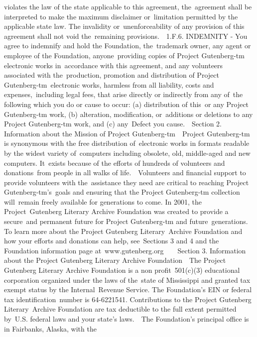 {violates the law of the state applicable to this agreement, the\
agreement shall be interpreted to make the maximum disclaimer or\
limitation permitted by the applicable state law. The invalidity or\
unenforceability of any provision of this agreement shall not void the\
remaining provisions.\
\
1.F.6. INDEMNITY - You agree to indemnify and hold the Foundation, the\
trademark owner, any agent or employee of the Foundation, anyone\
providing copies of Project Gutenberg-tm electronic works in\
accordance with this agreement, and any volunteers associated with the\
production, promotion and distribution of Project Gutenberg-tm\
electronic works, harmless from all liability, costs and expenses,\
including legal fees, that arise directly or indirectly from any of\
the following which you do or cause to occur: (a) distribution of this\
or any Project Gutenberg-tm work, (b) alteration, modification, or\
additions or deletions to any Project Gutenberg-tm work, and (c) any\
Defect you cause.\
\
Section 2. Information about the Mission of Project Gutenberg-tm\
\
Project Gutenberg-tm is synonymous with the free distribution of\
electronic works in formats readable by the widest variety of\
computers including obsolete, old, middle-aged and new computers. It\
exists because of the efforts of hundreds of volunteers and donations\
from people in all walks of life.\
\
Volunteers and financial support to provide volunteers with the\
assistance they need are critical to reaching Project Gutenberg-tm's\
goals and ensuring that the Project Gutenberg-tm collection will\
remain freely available for generations to come. In 2001, the Project\
Gutenberg Literary Archive Foundation was created to provide a secure\
and permanent future for Project Gutenberg-tm and future\
generations. To learn more about the Project Gutenberg Literary\
Archive Foundation and how your efforts and donations can help, see\
Sections 3 and 4 and the Foundation information page at\
www.gutenberg.org\
\
\
\
Section 3. Information about the Project Gutenberg Literary Archive Foundation\
\
The Project Gutenberg Literary Archive Foundation is a non profit\
501(c)(3) educational corporation organized under the laws of the\
state of Mississippi and granted tax exempt status by the Internal\
Revenue Service. The Foundation's EIN or federal tax identification\
number is 64-6221541. Contributions to the Project Gutenberg Literary\
Archive Foundation are tax deductible to the full extent permitted by\
U.S. federal laws and your state's laws.\
\
The Foundation's principal office is in Fairbanks, Alaska, with the\
}
